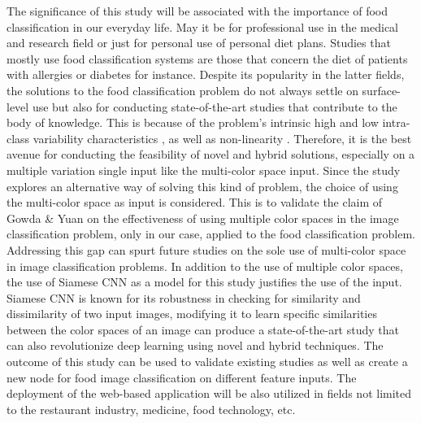 The significance of this study will be associated with the importance of food classification in our everyday life. May it be for professional use in the medical and research field or just for personal use of personal diet plans. Studies that mostly use food classification systems are those that concern the diet of patients with allergies or diabetes for instance. Despite its popularity in the latter fields, the solutions to the food classification problem do not always settle on surface-level use but also for conducting state-of-the-art studies that contribute to the body of knowledge. This is because of the problem's intrinsic high and low intra-class variability characteristics \cite{ciocca-2019}, as well as non-linearity \cite{islam-2018}. Therefore, it is the best avenue for conducting the feasibility of novel and hybrid solutions, especially on a multiple variation single input like the multi-color space input. Since the study explores an alternative way of solving this kind of problem, the choice of using the multi-color space as input is considered. This is to validate the claim of Gowda \& Yuan \cite{gowda-2019} on the effectiveness of using multiple color spaces in the image classification problem, only in our case, applied to the food classification problem. Addressing this gap can spurt future studies on the sole use of multi-color space in image classification problems. In addition to the use of multiple color spaces, the use of Siamese CNN as a model for this study justifies the use of the input. Siamese CNN is known for its robustness in checking for similarity and dissimilarity of two input images, modifying it to learn specific similarities between the color spaces of an image can produce a state-of-the-art study that can also revolutionize deep learning using novel and hybrid techniques. The outcome of this study can be used to validate existing studies as well as create a new node for food image classification on different feature inputs. The deployment of the web-based application will be also utilized in fields not limited to the restaurant industry, medicine, food technology, etc.